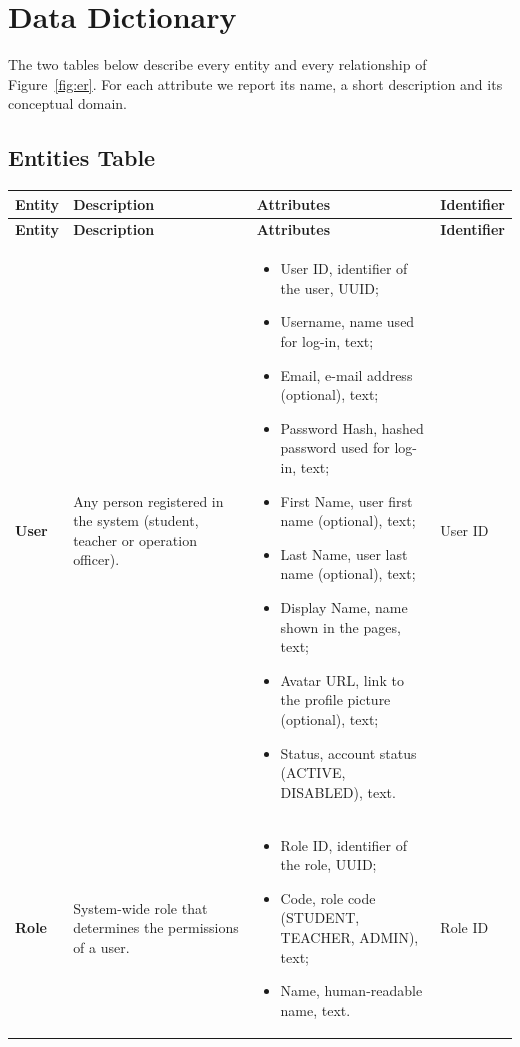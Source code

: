 \section{Data Dictionary}
The two tables below describe every entity and every relationship of Figure~\ref{fig:er}. For each attribute we report its name, a short description and its conceptual domain.

\subsection{Entities Table}
{\small
\begin{longtable}{|p{}|p{}|p{}|p{}|}
    \hline
    \textbf{Entity} & \textbf{Description} & \textbf{Attributes} & \textbf{Identifier} \\\hline
    \endfirsthead
    \hline
    \textbf{Entity} & \textbf{Description} & \textbf{Attributes} & \textbf{Identifier} \\\hline
    \endhead

    \textbf{User} & Any person registered in the system (student, teacher or operation officer). &
    \begin{itemize}[leftmargin=*,nosep,before=\vspace{-\baselineskip}\leavevmode,after=\vspace{-\baselineskip}]
        \item User ID, identifier of the user, UUID;
        \item Username, name used for log-in, text;
        \item Email, e-mail address (optional), text;
        \item Password Hash, hashed password used for log-in, text;
        \item First Name, user first name (optional), text;
        \item Last Name, user last name (optional), text;
        \item Display Name, name shown in the pages, text;
        \item Avatar URL, link to the profile picture (optional), text;
        \item Status, account status (ACTIVE, DISABLED), text.
    \end{itemize}
    & User ID \\ \hline

    \textbf{Role} & System-wide role that determines the permissions of a user. &
    \begin{itemize}[leftmargin=*,nosep,before=\vspace{-\baselineskip}\leavevmode,after=\vspace{-\baselineskip}]
        \item Role ID, identifier of the role, UUID;
        \item Code, role code (STUDENT, TEACHER, ADMIN), text;
        \item Name, human-readable name, text.
    \end{itemize}
    & Role ID \\ \hline


\end{longtable}}
